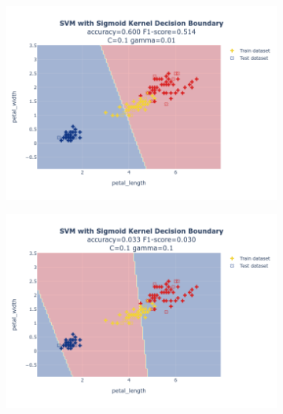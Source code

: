 \documentclass{article}
\begin{document}
\begin{figure}
\begin{subfigure}{0.3\textwidth}
        \includegraphics[scale=.13]{images/implementation/q1/sigmoid_kernel/petal_length_petal_width_0.1_0.01.png}
    \end{subfigure}
    \hfill
    \begin{subfigure}{0.3\textwidth}
        \centering
        \includegraphics[scale=.13]{images/implementation/q1/sigmoid_kernel/petal_length_petal_width_0.1_0.1.png}
    \end{subfigure}
    \newline
    \begin{subfigure}{0.3\textwidth}
        \centering

\end{subfigure}
\end{figure}
\end{document}
